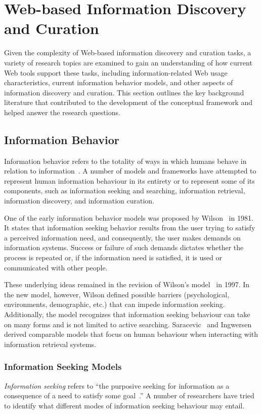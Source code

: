 \documentclass{sigchi}
\begin{document}
\section{Web-based Information Discovery and Curation}
Given the complexity of Web-based information discovery and curation tasks, a variety of research topics are examined to gain an understanding of how current Web tools support these tasks, including information-related Web usage characteristics, current information behavior models, and other aspects of information discovery and curation.  This section outlines the key background literature that contributed to the development of the conceptual framework and helped answer the research questions. 

\subsection{Information Behavior}
Information behavior refers to the totality of ways in which humans behave in relation to information~\cite{wilson2000human}.  A number of models and frameworks have attempted to represent human information behaviour in its entirety or to represent some of its components, such as information seeking and searching, information retrieval, information discovery, and information curation. 

One of the early information behavior models was proposed by Wilson~\cite{wilson1981user} in 1981. It states that information seeking behavior results from the user trying to satisfy a perceived information need, and consequently, the user makes demands on information systems. Success or failure of such demands dictates whether the process is repeated or, if the information need is satisfied, it is used or communicated with other people. 

These underlying ideas remained in the revision of Wilson's model~\cite{wilson1997information} in 1997. In the new model, however, Wilson defined possible barriers (psychological, environments, demographic, etc.) that can impede information seeking. Additionally, the model recognizes that information seeking behaviour can take on many forms and is not limited to active searching. Saracevic~\cite{saracevic1996modeling} and Ingwersen~\cite{ingwersen1996cognitive} derived comparable models that focus on human behaviour when interacting with information retrieval systems. 

\subsubsection{Information Seeking Models}
\textit{Information seeking} refers to ``the purposive seeking for information as a consequence of a need to satisfy some goal~\cite{wilson2000human}.'' A number of researchers have tried to identify what different modes of information seeking behaviour may entail. 
\end{document}
